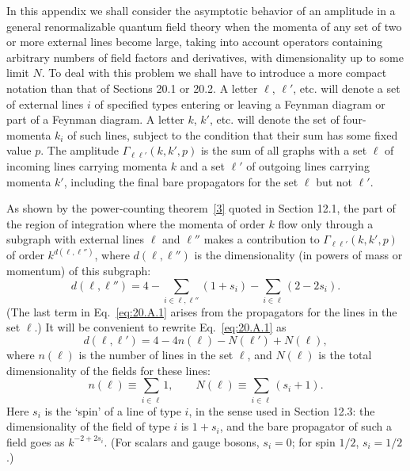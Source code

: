 
\label{app:20.A}

In this appendix we shall consider the asymptotic behavior of an amplitude in a general renormalizable quantum field theory when the momenta of any set of two or more external lines become large, taking into account operators containing arbitrary numbers of field factors and derivatives, with dimensionality up to some limit $N$. To deal with this problem we shall have to introduce a more compact notation than that of Sections 20.1 or 20.2. A letter $\ell$, $\ell'$, etc. will denote a set of external lines $i$ of specified types entering or leaving a Feynman diagram or part of a Feynman diagram. A letter $k$, $k'$, etc. will denote the set of four-momenta $k_i$ of such lines, subject to the condition that their sum has some fixed value $p$. The amplitude $\Gamma_{\ell\ell'}(k,k',p)$ is the sum of all graphs with a set $\ell$ of incoming lines carrying momenta $k$ and a set $\ell'$ of outgoing lines carrying momenta $k'$, including the final bare propagators for the set $\ell$ but not $\ell'$.

As shown by the power-counting theorem~\hyperref[ch20-ref-3]{[3]} quoted in Section 12.1, the part of the region of integration where the momenta of order $k$ flow only through a subgraph with external lines $\ell$ and $\ell''$ makes a contribution to $\Gamma_{\ell\ell'}(k,k',p)$ of order $k^{d(\ell,\ell'')}$, where $d(\ell,\ell'')$ is the dimensionality (in powers of mass or momentum) of this subgraph:
\begin{equation}
d(\ell,\ell'')
=4-\sum_{i\in\ell,\ell''}(1+s_i)
-\sum_{i\in\ell}(2-2s_i).
\tag{20.A.1}\label{eq:20.A.1}
\end{equation}
(The last term in Eq.~\eqref{eq:20.A.1} arises from the propagators for the lines in the set $\ell$.) It will be convenient to rewrite Eq.~\eqref{eq:20.A.1} as
\begin{equation}
d(\ell,\ell')
=4-4n(\ell)-N(\ell')+N(\ell),
\tag{20.A.2}\label{eq:20.A.2}
\end{equation}
where $n(\ell)$ is the number of lines in the set $\ell$, and $N(\ell)$ is the total dimensionality of the fields for these lines:
\begin{equation}
n(\ell)\equiv\sum_{i\in\ell}1,
\qquad
N(\ell)\equiv\sum_{i\in\ell}(s_i+1).
\tag{20.A.3}\label{eq:20.A.3}
\end{equation}
Here $s_i$ is the `spin' of a line of type $i$, in the sense used in Section 12.3: the dimensionality of the field of type $i$ is $1+s_i$, and the bare propagator of such a field goes as $k^{-2+2s_i}$. (For scalars and gauge bosons, $s_i=0$; for spin $1/2$, $s_i=1/2$.)

